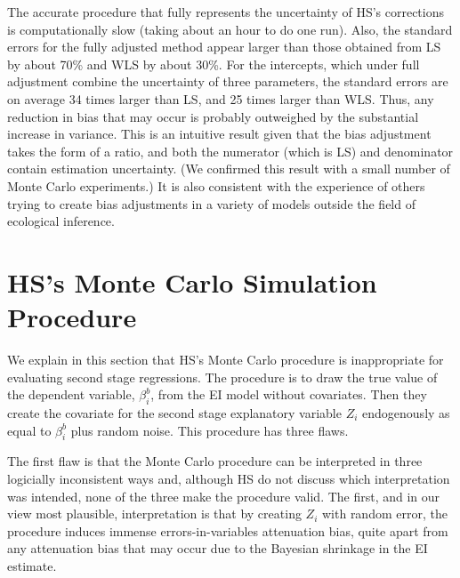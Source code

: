 \documentclass[11pt,titlepage]{article}
\begin{document}
The accurate procedure that fully represents the uncertainty of HS's
corrections is computationally slow (taking about an hour to do one
run).  Also, the standard errors for the fully adjusted method appear
larger than those obtained from LS by about 70\% and WLS by about
30\%.  For the intercepts, which under full adjustment combine the
uncertainty of three parameters, the standard errors are on average 34
times larger than LS, and 25 times larger than WLS.  Thus, any
reduction in bias that may occur is probably outweighed by the
substantial increase in variance.  This is an intuitive result given
that the bias adjustment takes the form of a ratio, and both the
numerator (which is LS) and denominator contain estimation
uncertainty.  (We confirmed this result with a small number of Monte
Carlo experiments.)  It is also consistent with the experience of
others trying to create bias adjustments in a variety of models
outside the field of ecological inference.

\section{HS's Monte Carlo Simulation Procedure}

We explain in this section that HS's Monte Carlo procedure is
inappropriate for evaluating second stage regressions.  The procedure
is to draw the true value of the dependent variable, $\beta_i^b$, from
the EI model without covariates.  Then they create the covariate for
the second stage explanatory variable $Z_i$ endogenously as equal to
$\beta_i^b$ plus random noise.  This procedure has three flaws.

The first flaw is that the Monte Carlo procedure can be interpreted in
three logicially inconsistent ways and, although HS do not discuss
which interpretation was intended, none of the three make the
procedure valid.  The first, and in our view most plausible,
interpretation is that by creating $Z_i$ with random error, the
procedure induces immense errors-in-variables attenuation bias, quite
apart from any attenuation bias that may occur due to the Bayesian
shrinkage in the EI estimate.
\end{document}
